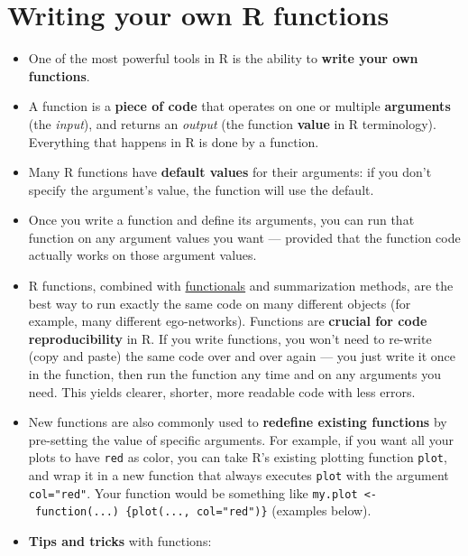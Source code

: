 \documentclass[
]{book}
\providecommand{\tightlist}{%
  \setlength{\itemsep}{0pt}\setlength{\parskip}{0pt}}
\begin{document}
\hypertarget{functions}{%
\section{Writing your own R functions}\label{functions}}

\begin{itemize}
\tightlist
\item
  One of the most powerful tools in R is the ability to \textbf{write your own functions}.
\item
  A function is a \textbf{piece of code} that operates on one or multiple \textbf{arguments} (the \emph{input}), and returns an \emph{output} (the function \textbf{value} in R terminology). Everything that happens in R is done by a function.
\item
  Many R functions have \textbf{default values} for their arguments: if you don't specify the argument's value, the function will use the default.
\item
  Once you write a function and define its arguments, you can run that function on any argument values you want --- provided that the function code actually works on those argument values.
\item
  R functions, combined with \href{https://adv-r.hadley.nz/functionals.html}{functionals} and summarization methods, are the best way to run exactly the same code on many different objects (for example, many different ego-networks). Functions are \textbf{crucial for code reproducibility} in R. If you write functions, you won't need to re-write (copy and paste) the same code over and over again --- you just write it once in the function, then run the function any time and on any arguments you need. This yields clearer, shorter, more readable code with less errors.
\item
  New functions are also commonly used to \textbf{redefine existing functions} by pre-setting the value of specific arguments. For example, if you want all your plots to have \texttt{red} as color, you can take R's existing plotting function \texttt{plot}, and wrap it in a new function that always executes \texttt{plot} with the argument \texttt{col="red"}. Your function would be something like \texttt{my.plot\ \textless{}-\ function(...)\ \{plot(...,\ col="red")\}} (examples below).
\item
  \textbf{Tips and tricks} with functions:


\end{itemize}
\end{document}
